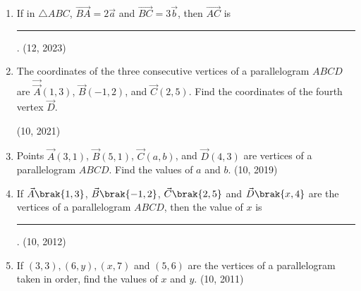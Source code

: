 \begin{enumerate}[label=\thesubsection.\arabic*, ref=\thesubsection.\theenumi]
    \item If in $\triangle ABC$, $\overrightarrow{BA} = 2\vec{a}$ and $\overrightarrow{BC} = 3\vec{b}$, then $\overrightarrow{AC}$ is
\rule{1cm}{0.2pt}.
    \hfill (12, 2023)
	\item The coordinates of the three consecutive vertices of a parallelogram $ABCD$ are $\vec{\vec{A}}(1, 3)$, $\vec{B}(-1, 2)$, and $\vec{C}(2, 5)$. Find the coordinates of the fourth vertex $\vec{D}$. 

		\hfill (10, 2021)
\item Points $\vec{A}(3, 1)$, $\vec{B}(5, 1)$, $\vec{C}(a, b)$, and $\vec{D}(4, 3)$ are vertices of a parallelogram $ABCD$. Find the values of $a$ and $b$. \hfill (10, 2019)
\item If $\vec{A}\brak{1,3}$, $\vec{B}\brak{-1,2}$, $\vec{C}\brak{2,5}$ and $\vec{D}\brak{x,4}$ are the vertices of a parallelogram $ABCD$, then the value of $x$ is
\rule{1cm}{0.2pt}.
\hfill (10, 2012)
    \item If $(3,3),(6,y),(x,7)$ and $(5,6)$ are the vertices of a parallelogram taken in order, find the values of $x$ and $y$.
\hfill (10, 2011)
	
\end{enumerate}
